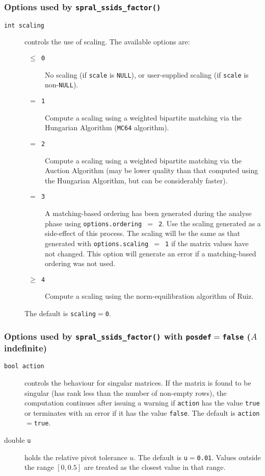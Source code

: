 \subsubsection*{Options used by {\tt spral\_ssids\_factor()}}
\begin{description}
\item[\texttt{int scaling}] controls
the use of scaling. The available
options are:
\begin{description}
   \item[\texttt{ $\le$ 0 }] No scaling (if \texttt{scale} is \texttt{NULL}),
      or user-supplied scaling (if \texttt{scale} is non-\texttt{NULL}).
   \item[\texttt{ $=$ 1 }] Compute a scaling using a weighted bipartite matching
      via the Hungarian Algorithm (\texttt{MC64} algorithm).
   \item[\texttt{ $=$ 2 }] Compute a scaling using a weighted bipartite matching
      via the Auction Algorithm (may be lower quality than that computed using 
      the Hungarian Algorithm, but can be considerably faster).
   \item[\texttt{ $=$ 3 }] A matching-based ordering has been generated during the
      analyse phase using {\tt options.ordering $=$ 2}. Use the
      scaling generated as a side-effect of this process. The scaling will be
      the same as that generated with {\tt options.scaling $=$ 1} if the matrix
      values have not changed. This option will generate an error if a
      matching-based ordering was not used.
   \item[\texttt{ $\ge$ 4 }] Compute a scaling using the norm-equilibration
      algorithm of Ruiz.
\end{description}
The default is {\tt scaling}$=${\tt 0}.

\end{description}

\subsubsection*{Options used by {\tt spral\_ssids\_factor()} with
{\tt posdef}$ =${\tt false}  ($A$ indefinite)}

\begin{description}
\item[\texttt{bool action}] controls the behaviour for singular matrices.
If the matrix is found to be singular (has rank less than the number of
non-empty rows), the computation continues after issuing a warning if
{\tt action} has the value {\tt true} or
terminates with an error if it has the value {\tt false}.
The default is {\tt action}$=${\tt true}.


\item[double \texttt{u}] holds the relative pivot
tolerance $u$.
The default is {\tt u}$=${\tt 0.01}.
Values outside the range $[0,0.5]$ are treated as the closest value in that range.

\end{description}

